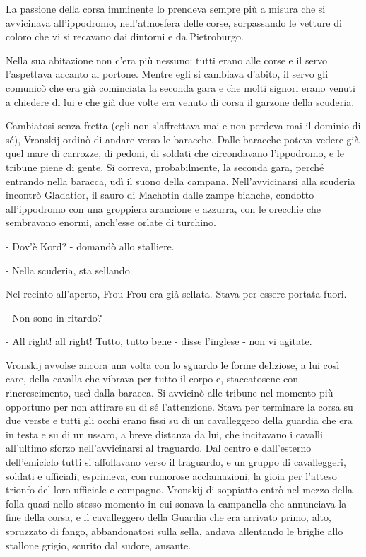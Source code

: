 La passione della corsa imminente lo prendeva sempre più a misura che si avvicinava all'ippodromo, nell'atmosfera delle corse, sorpassando le vetture di coloro che vi si recavano dai dintorni e da Pietroburgo. 

Nella sua abitazione non c'era più nessuno: tutti erano alle corse e il servo l'aspettava accanto al portone. Mentre egli si cambiava d'abito, il servo gli comunicò che era già cominciata la seconda gara e che molti signori erano venuti a chiedere di lui e che già due volte era venuto di corsa il garzone della scuderia. 

Cambiatosi senza fretta (egli non s'affrettava mai e non perdeva mai il dominio di sé), Vronskij ordinò di andare verso le baracche. Dalle baracche poteva vedere già quel mare di carrozze, di pedoni, di soldati che circondavano l'ippodromo, e le tribune piene di gente. Si correva, probabilmente, la seconda gara, perché entrando nella baracca, udì il suono della campana. Nell'avvicinarsi alla scuderia incontrò Gladatior, il sauro di Machotin dalle zampe bianche, condotto all'ippodromo con una groppiera arancione e azzurra, con le orecchie che sembravano enormi, anch'esse orlate di turchino. 

- Dov'è Kord? - domandò allo stalliere. 

- Nella scuderia, sta sellando. 

Nel recinto all'aperto, Frou-Frou era già sellata. Stava per essere portata fuori. 

- Non sono in ritardo? 

- All right! all right! Tutto, tutto bene - disse l'inglese - non vi agitate. 

Vronskij avvolse ancora una volta con lo sguardo le forme deliziose, a lui così care, della cavalla che vibrava per tutto il corpo e, staccatosene con rincrescimento, uscì dalla baracca. Si avvicinò alle tribune nel momento più opportuno per non attirare su di sé l'attenzione. Stava per terminare la corsa su due verste e tutti gli occhi erano fissi su di un cavalleggero della guardia che era in testa e su di un ussaro, a breve distanza da lui, che incitavano i cavalli all'ultimo sforzo nell'avvicinarsi al traguardo. Dal centro e dall'esterno dell'emiciclo tutti si affollavano verso il traguardo, e un gruppo di cavalleggeri, soldati e ufficiali, esprimeva, con rumorose acclamazioni, la gioia per l'atteso trionfo del loro ufficiale e compagno. Vronskij di soppiatto entrò nel mezzo della folla quasi nello stesso momento in cui sonava la campanella che annunciava la fine della corsa, e il cavalleggero della Guardia che era arrivato primo, alto, spruzzato di fango, abbandonatosi sulla sella, andava allentando le briglie allo stallone grigio, scurito dal sudore, ansante. 

